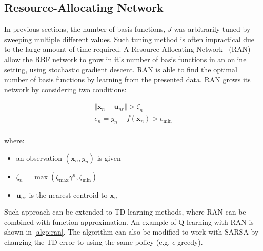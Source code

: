 \documentclass{article}
\begin{document}
\subsection{Resource-Allocating Network}

In previous sections, the number of basis functions, $J$ was arbitrarily tuned by sweeping multiple different values. Such tuning method is often impractical due to the large amount of time required. A Resource-Allocating Network~\cite{plattResourceallocatingNetworkFunction1991} (RAN) allow the RBF network to grow in it's number of basis functions in an online setting, using stochastic gradient descent. RAN is able to find the optimal number of basis functions by learning from the presented data. RAN grows its network by considering two conditions:

\begin{equation}
    \begin{split}
        \Vert \pmb{x}_n - \pmb{u}_{nr} \Vert > \zeta_n\\
        e_n = y_n - f(\pmb{x}_n) > e_{\min}\\
    \end{split}
\end{equation}

where:
\begin{itemize}
    \item an observation $(\pmb{x}_n, y_n)$ is given
    \item $\zeta_n = \max(\zeta_{\max} \gamma^n, \zeta_{\min})$
    \item $\pmb{u}_{nr}$ is the nearest centroid to $\pmb{x}_n$
\end{itemize}


Such approach can be extended to TD learning methods, where RAN can be combined with function approximation. An example of Q learning with RAN is shown in \cref{algo:ran}. The algorithm can also be modified to work with SARSA by changing the TD error to using the same policy (e.g. $\epsilon$-greedy).
\end{document}

